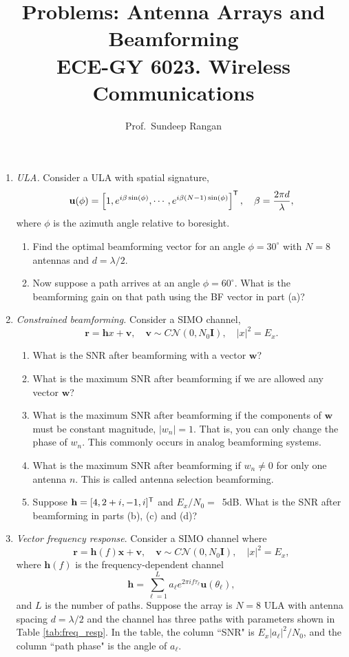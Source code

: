 \documentclass[11pt]{article}
\newcommand{\hbf}{\mathbf{h}}
\newcommand{\rbf}{\mathbf{r}}
\newcommand{\ubf}{\mathbf{u}}
\newcommand{\vbf}{\mathbf{v}}
\newcommand{\wbf}{\mathbf{w}}
\newcommand{\xbf}{\mathbf{x}}
\newcommand{\Ibf}{\mathbf{I}}
\newcommand{\tran}{^{\text{\sf T}}}
\begin{document}
\title{Problems:  Antenna Arrays and Beamforming\\
ECE-GY 6023. Wireless Communications}
\author{Prof.\ Sundeep Rangan}
\date{}

\maketitle


\begin{enumerate}

\item \emph{ULA.}  Consider a ULA with spatial signature,
\[
    \ubf(\phi) = \left[ 1, e^{i \beta \sin(\phi)}, \cdots,
    e^{i \beta(N-1) \sin(\phi)} \right]\tran, \quad
    \beta = \frac{2\pi d}{\lambda},
\]
where $\phi$ is the azimuth angle relative to boresight.
\begin{enumerate}[label=(\alph*)]
\item Find the optimal beamforming vector for an angle $\phi= 30^\circ$
with $N=8$ antennas and $d=\lambda/2$.
\item Now suppose a path arrives at an angle $\phi = 60^\circ$.
What is the beamforming gain on that path using the BF vector in part (a)?
\end{enumerate}

\item \emph{Constrained beamforming.} Consider a SIMO channel,
\[
    \rbf = \hbf x + \vbf, \quad \vbf \sim C{\mathcal N}(0,N_0 \Ibf), \quad |x|^2 = E_x.
\]
\begin{enumerate}[label=(\alph*)]
\item What is the SNR after beamforming with a vector $\wbf$?
\item What is the maximum SNR after beamforming if we are allowed any vector $\wbf$?
\item What is the maximum SNR after beamforming if the components of $\wbf$
must be constant magnitude, $|w_n| = 1$.  That is, you can only change the phase of $w_n$.
This commonly occurs in analog beamforming systems.
\item What is the maximum SNR after beamforming if
$w_n \neq 0$ for only one antenna $n$.  This is called antenna selection beamforming.
\item Suppose $\hbf = [4,2+i,-1,i]\tran$ and $E_x/N_0=$\, \si{5}{dB}.  What is the SNR
after beamforming in parts (b), (c) and (d)?
\end{enumerate}


\item \label{prob:freq_resp}
\emph{Vector frequency response}.  Consider a SIMO channel where
\[
    \rbf = \hbf(f)\xbf + \vbf, \quad \vbf \sim C{\mathcal N}(0,N_0 \Ibf), \quad |x|^2 = E_x,
\]
where $\hbf(f)$ is the frequency-dependent channel
\[
    \hbf = \sum_{\ell=1}^L a_\ell e^{2\pi if \tau_\ell} \ubf(\theta_\ell),
\]
and $L$ is the number of paths. Suppose the
array is $N=8$ ULA with antenna spacing $d=\lambda/2$ and the channel
has three paths with parameters shown in Table \ref{tab:freq_resp}.
In the table, the column ``SNR" is $E_x|a_\ell|^2/N_0$, and the column ``path phase" is the angle of $a_\ell$.


\end{enumerate}
\end{document}
